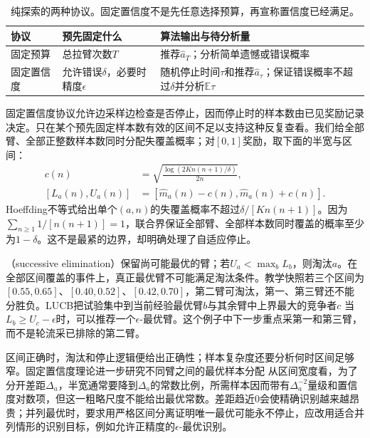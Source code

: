 \begin{table}[htbp]
  \centering
  \small
  \begin{tabularx}{\linewidth}{>{\raggedright\arraybackslash}p{22mm} >{\raggedright\arraybackslash}X >{\raggedright\arraybackslash}X}
    \toprule
    协议 & 预先固定什么 & 算法输出与待分析量 \\
    \midrule
    固定预算 & 总拉臂次数$T$ & 推荐$\widehat a_T$；分析简单遗憾或错误概率 \\
    固定置信度 & 允许错误$\delta$，必要时精度$\epsilon$ & 随机停止时间$\tau$和推荐$\widehat a_\tau$；保证错误概率不超过$\delta$并分析$\mathbb E\tau$ \\
    \bottomrule
  \end{tabularx}
  \caption{纯探索的两种协议。固定置信度不是先任意选择预算，再宣称置信度已经满足。}
  \label{tab:rl-learning-identification-protocols}
\end{table}

固定置信度协议允许边采样边检查是否停止，因而停止时的样本数由已见奖励记录决定。只在某个预先固定样本数有效的区间不足以支持这种反复查看。我们给全部臂、全部正整数样本数同时分配失覆盖概率；对$[0,1]$奖励，取下面的半宽与区间：
\[
  \begin{aligned}
    c(n)&=\sqrt{\frac{\log(2K n(n+1)/\delta)}{2n}},\\
    [L_a(n),U_a(n)]&=[\widehat m_a(n)-c(n),\widehat m_a(n)+c(n)].
  \end{aligned}
\]
Hoeffding不等式给出单个$(a,n)$的失覆盖概率不超过$\delta/[K n(n+1)]$。因为$\sum_{n\geq1}1/[n(n+1)]=1$，联合界保证全部臂、全部样本数同时覆盖的概率至少为$1-\delta$。这不是最紧的边界，却明确处理了自适应停止。

（successive elimination）保留尚可能最优的臂；若$U_a<\max_b L_b$，则淘汰$a$。在全部区间覆盖的事件上，真正最优臂不可能满足淘汰条件。教学快照若三个区间为$[0.55,0.65]$、$[0.40,0.52]$、$[0.42,0.70]$，第二臂可淘汰，第一、第三臂还不能分胜负。LUCB把试验集中到当前经验最优臂$b$与其余臂中上界最大的竞争者$c$
当$L_b\geq U_c-\epsilon$时，可以推荐一个$\epsilon$-最优臂。这个例子中下一步重点采第一和第三臂，而不是轮流采已排除的第二臂。

区间正确时，淘汰和停止逻辑便给出正确性；样本复杂度还要分析何时区间足够窄。固定置信度理论进一步研究不同臂之间的最优样本分配
从区间宽度看，为了分开差距$\Delta_a$，半宽通常要降到$\Delta_a$的常数比例，所需样本因而带有$\Delta_a^{-2}$量级和置信度对数项，但这一粗略尺度不能给出最优常数。差距趋近0会使精确识别越来越昂贵；并列最优时，要求用严格区间分离证明唯一最优可能永不停止，应改用适合并列情形的识别目标，例如允许正精度的$\epsilon$-最优识别。

